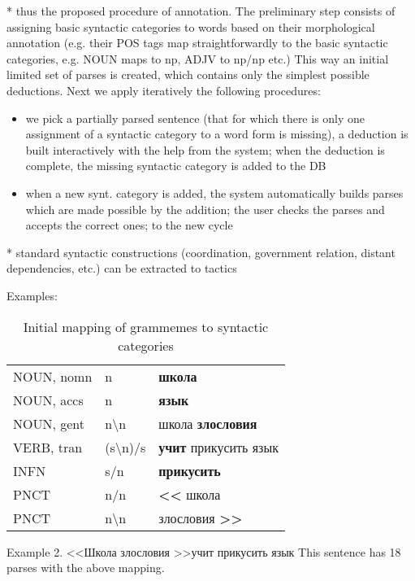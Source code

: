 \documentclass[a4paper]{article}
\theoremstyle{example-style}
\begin{document}
  * thus the proposed procedure of annotation. The preliminary step consists of assigning basic syntactic categories to words based on their morphological annotation (e.g. their POS tags map straightforwardly to the basic syntactic categories, e.g. NOUN maps to np, ADJV to np/np etc.) This way an initial limited set of parses is created, which contains only the simplest possible deductions. Next we apply iteratively the following procedures:
  \begin{itemize}
  	\item we pick a partially parsed sentence (that for which there is only one assignment of a syntactic category to a word form is missing), a deduction is built interactively with the help from the system; when the deduction is complete, the missing syntactic category is added to the DB
  	\item when a new synt. category is added, the system automatically builds parses which are made possible by the addition; the user checks the parses and accepts the correct ones; to the new cycle
  \end{itemize} 
  
  * standard syntactic constructions (coordination, government relation, distant dependencies, etc.) can be extracted to tactics 
    
Examples:

\begin{table}[]
\centering
\caption{Initial mapping of grammemes to syntactic categories}
\label{my-label}
\begin{tabular}{lll}
NOUN, nomn & n         & \textbf{школа}                              \\
NOUN, accs & n         & \textbf{язык}                               \\
NOUN, gent & n\textbackslash n      & школа \textbf{злословия}       \\
VERB, tran & (s\textbackslash n)/s & \textbf{учит} прикусить язык    \\
INFN       & s/n       & \textbf{прикусить}                          \\
PNCT       & n/n       & \textbf{\textless\textless} школа           \\
PNCT       & n\textbackslash n      & злословия \textbf{\textgreater\textgreater} 
\end{tabular}
\end{table}    
    
Example 2. \textless\textless Школа злословия \textgreater\textgreater учит прикусить язык
This sentence has 18 parses with the above mapping.
\end{document}
